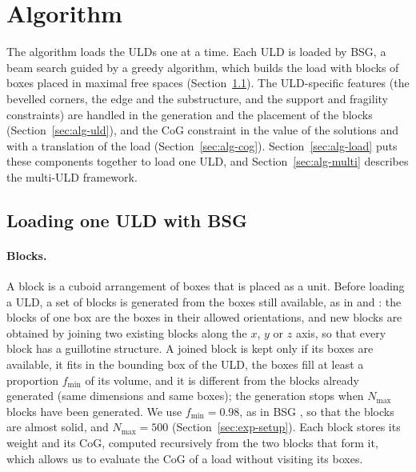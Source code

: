 \section{Algorithm}
\label{sec:algorithm}

The algorithm loads the ULDs one at a time. Each ULD is loaded by BSG, a beam search guided by a
greedy algorithm, which builds the load with blocks of boxes placed in maximal free spaces
(Section~\ref{sec:alg-bsg}). The ULD-specific features (the bevelled corners, the edge and the
substructure, and the support and fragility constraints) are handled in the generation and the
placement of the blocks (Section~\ref{sec:alg-uld}), and the CoG constraint in the value of the solutions and with a
translation of the load (Section~\ref{sec:alg-cog}). Section~\ref{sec:alg-load} puts these components
together to load one ULD, and Section~\ref{sec:alg-multi} describes the multi-ULD framework.

\subsection{Loading one ULD with BSG}
\label{sec:alg-bsg}

\paragraph{Blocks.}
A block is a cuboid arrangement of boxes that is placed as a unit. Before loading a ULD, a set
of blocks is generated from the boxes still available, as in \citet{Fanslau2010} and \citet{Araya2014}: the blocks of
one box are the boxes in their allowed orientations, and new blocks are obtained by joining two
existing blocks along the $x$, $y$ or $z$ axis, so that every block has a guillotine structure.
A joined block is kept only if its boxes are available, it fits in the bounding box of the ULD,
the boxes fill at least a proportion $f_{\min}$ of its volume, and it is different from the
blocks already generated (same dimensions and same boxes); the generation stops when
$N_{\max}$ blocks have been generated. We use $f_{\min} = 0.98$, as in BSG
\citep{Araya2014}, so that the blocks are almost solid, and $N_{\max} = 500$
(Section~\ref{sec:exp-setup}). Each block stores its weight and its CoG, computed recursively from the two
blocks that form it, which allows us to evaluate the CoG of a load without visiting its boxes.

